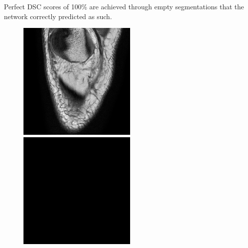 Perfect DSC scores of 100\% are achieved through empty segmentations that the network correctly predicted as such.

\begin{figure}[H]
  \includegraphics[width=\linewidth]{imgs/a5.png}
\endminipage\hfill
{}
  \includegraphics[width=\linewidth]{imgs/b5.png}

\end{figure}
